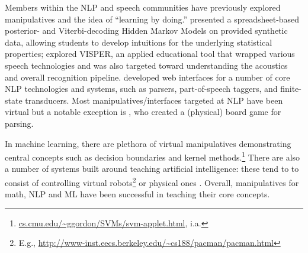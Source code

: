 \documentclass[11pt,letterpaper]{article}
\newcommand{\Note}[1]{}
\renewcommand{\Note}[1]{\hl{[#1]}}
\newcommand{\NoteSigned}[3]{{\sethlcolor{#2}\Note{#1: #3}}}
\newcommand{\NoteJE}[1]{\NoteSigned{JE}{LightGreen}{#1}}
\newcommand{\Commented}[1]{}
\begin{document}
\Commented{
"Clements and Sarama
(2005) cite six categories of math that emerge through
play: ‘‘classiﬁcation (grouping and sorting), magnitude
(describing or comparing the size of objects), dynamics
(putting things together and taking them apart), pattern and
shape (identifying or creating patterns or shapes, exploring
geometry concepts), spatial relations (describing or drawing a location or direction), and enumeration (saying
number words, counting, recognizing a number of objects,
or reading and writing numbers’’" \cite{linder2011early}
}

\Commented{
\NoteJE{Start by explaining the use of manipulatives in early math
  education, perhaps including an example and a quote.  I tried to set
  this up at the end of the previous section by talking about
  ``familiar objects with predictable behavior.''  The bottom line is
  that we'd like students to develop \emph{physical} intuitions about
  these abstract models.}
}

Members within the NLP and speech communities have previously explored manipulatives and the idea of
``learning by doing.''
 presented a spreadsheet-based posterior- and Viterbi-decoding Hidden Markov Models 
on provided synthetic data, allowing students to develop intuitions for the underlying statistical properties; 
 explored VISPER, an applied educational tool that wrapped various speech technologies and 
was also targeted toward understanding the acoustics and overall recognition pipeline. 
 developed web interfaces for a number of core NLP technologies and systems, such as parsers, part-of-speech 
taggers, and finite-state transducers. 
Most manipulatives/interfaces targeted at NLP have been virtual but a notable exception is , 
who created a (physical) board game for parsing. 

In machine learning, there are plethora of virtual manipulatives demonstrating central concepts such 
as decision boundaries and kernel methods.\footnote{\url{cs.cmu.edu/~ggordon/SVMs/svm-applet.html}, i.a.} 
There are also a number of systems built around teaching artificial intelligence: these tend to to consist of controlling 
virtual robots\footnote{E.g., \url{http://www-inst.eecs.berkeley.edu/~cs188/pacman/pacman.html}}
or physical ones \cite{tokic2012robot}.
Overall, manipulatives for math, NLP and ML have been successful in teaching their core concepts. 
\end{document}
